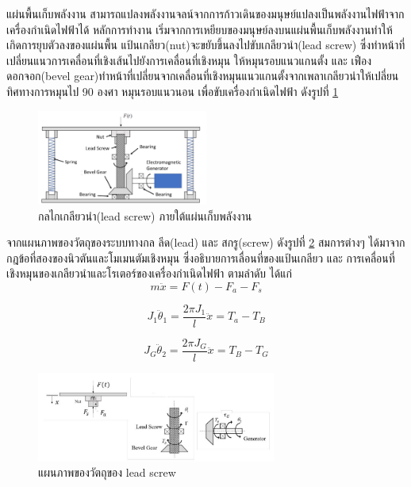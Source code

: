 \documentclass[11pt,a4paper]{article}
\begin{document}
แผ่นพื้นเก็บพลังงาน สามารถแปลงพลังงานจลน์จากการก้าวเดินของมนุษย์แปลงเป็นพลังงานไฟฟ้าจากเครื่องกำเนิดไฟฟ้าได้
หลักการทำงาน เริ่มจากการเหยียบของมนุษย์ลงบนแผ่นพื้นเก็บพลังงานทำให้เกิดการยุบตัวลงของแผ่นพื้น แป้นเกลียว(nut)จะขยับขึ้นลงไปขับเกลียวนำ(lead screw) ซึ่งทำหน้าที่เปลี่ยนแนวการเคลื่อนที่เชิงเส้นไปยังการเคลื่อนที่เชิงหมุน
ให้หมุนรอบแนวแกนตั้ง และ เฟืองดอกจอก(bevel gear)ทำหน้าที่เปลี่ยนจากเคลื่อนที่เชิงหมุนแนวแกนตั้งจากเพลาเกลียวนำให้เปลี่ยนทิศทางการหมุนไป 90 องศา หมุนรอบแนวนอน เพื่อขับเครื่องกำเนิดไฟฟ้า ดังรูปที่ \ref{lead-screw_lx}

\begin{figure}[h!]
    \begin{center}
        \includegraphics[width=0.5\textwidth]{lead-screw_lx.png}
    \end{center}
    \caption{กลไกเกลียวนำ(lead screw) ภายใต้แผ่นเก็บพลังงาน\cite{GpH:01}}
    \label{lead-screw_lx}
\end{figure}

จากแผนภาพของวัตถุของระบบทางกล ลีด(lead) และ สกรู(screw) ดังรูปที่ \ref{free_body_lx} สมการต่างๆ ได้มาจากกฎข้อที่สองของนิวตันและโมเมนตัมเชิงหมุน ซึ่งอธิบายการเลื่อนที่ของแป้นเกลียว และ การเคลื่อนที่เชิงหมุนของเกลียวนำและโรเตอร์ของเครื่องกำเนิดไฟฟ้า ตามลำดับ ได้แก่
\newpage
\begin{equation}
    m\ddot{x} = F(t)-F_{a}-F_{s}
\end{equation}

\begin{equation}
    J_{1}\ddot{\theta}_{1} = \frac{2\pi J_{1}}{l}\ddot{x} = T_{a}-T_{B}
\end{equation}

\begin{equation}
    J_{G}\ddot{\theta}_{2} = \frac{2\pi J_{G}}{l}\ddot{x} = T_{B}-T_{G}
\end{equation}

\begin{figure}[h!]
    \begin{center}
        \includegraphics[width=0.7\textwidth]{free_body_lx.png}
    \end{center}
    \caption{แผนภาพของวัตถุของ lead screw}
    \label{free_body_lx}
\end{figure}
\end{document}
